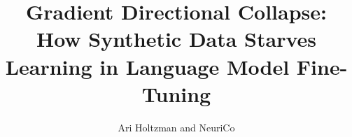 \documentclass{article}
\title{Gradient Directional Collapse: How Synthetic Data Starves Learning in Language Model Fine-Tuning}
\author{Ari Holtzman and NeuriCo}
\begin{document}
\maketitle

\begin{abstract}

\end{abstract}










\end{document}
